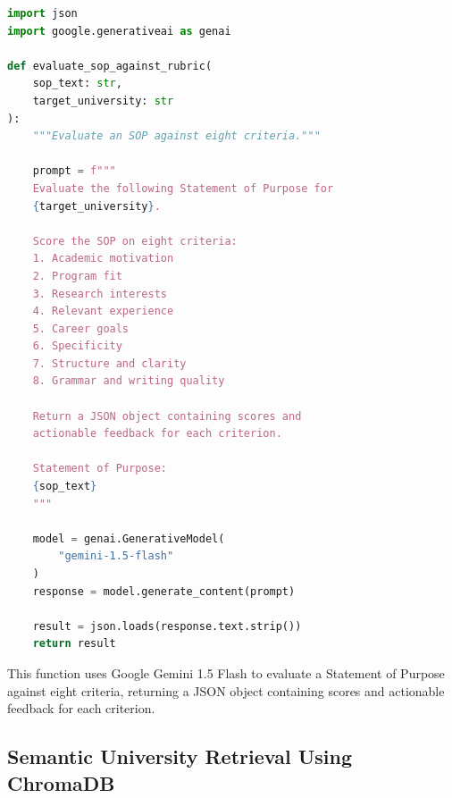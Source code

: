 \begin{lstlisting}[language=Python]
import json
import google.generativeai as genai

def evaluate_sop_against_rubric(
    sop_text: str,
    target_university: str
):
    """Evaluate an SOP against eight criteria."""

    prompt = f"""
    Evaluate the following Statement of Purpose for
    {target_university}.

    Score the SOP on eight criteria:
    1. Academic motivation
    2. Program fit
    3. Research interests
    4. Relevant experience
    5. Career goals
    6. Specificity
    7. Structure and clarity
    8. Grammar and writing quality

    Return a JSON object containing scores and
    actionable feedback for each criterion.

    Statement of Purpose:
    {sop_text}
    """

    model = genai.GenerativeModel(
        "gemini-1.5-flash"
    )
    response = model.generate_content(prompt)

    result = json.loads(response.text.strip())
    return result
\end{lstlisting}

\vspace{25pt}
This function uses Google Gemini 1.5 Flash to evaluate a Statement of Purpose against eight criteria, returning a JSON object containing scores and actionable feedback for each criterion.



\clearpage
\subsection{Semantic University Retrieval Using ChromaDB}

